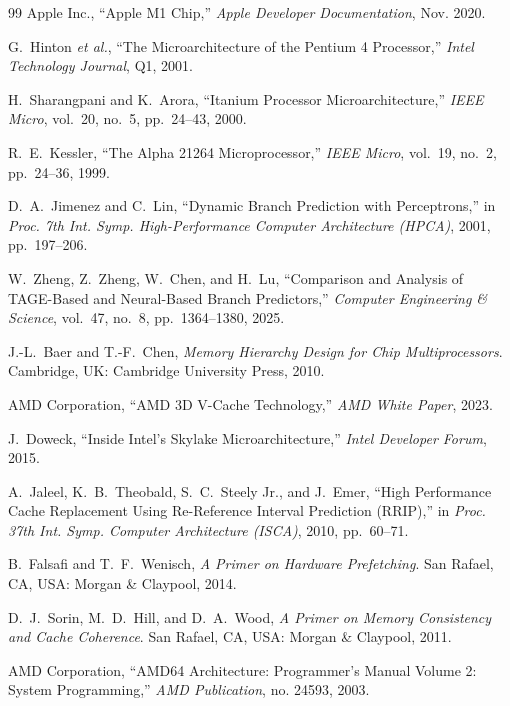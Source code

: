 \documentclass[12pt,a4paper]{IEEEtran}
\begin{document}
\begin{thebibliography}{99}
Apple Inc.,
``Apple M1 Chip,''
\textit{Apple Developer Documentation}, Nov. 2020.

G.~Hinton \textit{et al.},
``The Microarchitecture of the Pentium 4 Processor,''
\textit{Intel Technology Journal}, Q1, 2001.

H.~Sharangpani and K.~Arora,
``Itanium Processor Microarchitecture,''
\textit{IEEE Micro}, vol.~20, no.~5, pp.~24--43, 2000.

R.~E.~Kessler,
``The Alpha 21264 Microprocessor,''
\textit{IEEE Micro}, vol.~19, no.~2, pp.~24--36, 1999.

D.~A.~Jimenez and C.~Lin,
``Dynamic Branch Prediction with Perceptrons,''
in \textit{Proc. 7th Int. Symp. High-Performance Computer Architecture (HPCA)}, 2001, pp.~197--206.

W.~Zheng, Z.~Zheng, W.~Chen, and H.~Lu,
``Comparison and Analysis of TAGE-Based and Neural-Based Branch Predictors,''
\textit{Computer Engineering \& Science}, vol.~47, no.~8, pp.~1364--1380, 2025.

J.-L.~Baer and T.-F.~Chen,
\textit{Memory Hierarchy Design for Chip Multiprocessors}.
Cambridge, UK: Cambridge University Press, 2010.

AMD Corporation,
``AMD 3D V-Cache Technology,''
\textit{AMD White Paper}, 2023.

J.~Doweck,
``Inside Intel's Skylake Microarchitecture,''
\textit{Intel Developer Forum}, 2015.

A.~Jaleel, K.~B.~Theobald, S.~C.~Steely Jr., and J.~Emer,
``High Performance Cache Replacement Using Re-Reference Interval Prediction (RRIP),''
in \textit{Proc. 37th Int. Symp. Computer Architecture (ISCA)}, 2010, pp.~60--71.

B.~Falsafi and T.~F.~Wenisch,
\textit{A Primer on Hardware Prefetching}.
San Rafael, CA, USA: Morgan \& Claypool, 2014.

D.~J.~Sorin, M.~D.~Hill, and D.~A.~Wood,
\textit{A Primer on Memory Consistency and Cache Coherence}.
San Rafael, CA, USA: Morgan \& Claypool, 2011.

AMD Corporation,
``AMD64 Architecture: Programmer's Manual Volume 2: System Programming,''
\textit{AMD Publication}, no. 24593, 2003.


\end{thebibliography}
\end{document}
